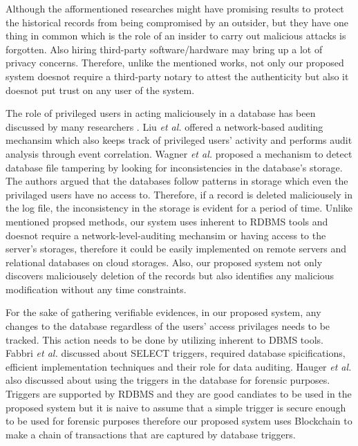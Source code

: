 Although the afformentioned researches might have promising results to protect the historical records from being compromised by an outsider, but they have one thing in common which is the role of an insider to carry out malicious attacks is forgotten. Also hiring third-party software/hardware may bring up a lot of privacy concerns. Therefore, unlike the mentioned works, not only our proposed system doesnot require a third-party notary to attest the authenticity but also it doesnot put trust on any user of the system.

The role of privileged users in acting maliciousely in a database has been discussed by many researchers \cite{crosby2009tamper-evident} \cite{wagner2018detect}. Liu {\it et al.} offered a network-based auditing mechansim which also keeps track of privileged users' activity and performs audit analysis through event correlation. Wagner {\it et al.} \cite{wanger2017carving} proposed a mechanism to detect database file tampering by looking for inconsistencies in the database's storage. The authors argued that the databases follow patterns in storage which even the privilaged users have no access to. Therefore, if a record is deleted maliciousely in the log file, the inconsistency in the storage is evident for a period of time. Unlike mentioned propsed methods, our system uses inherent to RDBMS tools and doesnot require a network-level-auditing mechansim or having access to the server's storages, therefore it could be easily implemented on remote servers and relational databases on cloud storages. Also, our proposed system not only discovers maliciousely deletion of the records but also identifies any malicious modification without any time constraints.

For the sake of gathering verifiable evidences, in our proposed system, any changes to the database regardless of the users' access privilages needs to be tracked. This action needs to be done by utilizing inherent to DBMS tools. Fabbri {\it et al.} \cite{fabbri2013select} discussed about SELECT triggers, required database spicifications, efficient implementation techniques and their role for data auditing. Hauger {\it et al.}\cite{hauger2014information} also discussed about using the triggers in the database for forensic purposes. Triggers are supported by RDBMS and they are good candiates to be used in the proposed system but it is naive to assume that a simple trigger is secure enough to be used for forensic purposes therefore our proposed system uses Blockchain to make a chain of transactions that are captured by database triggers.

